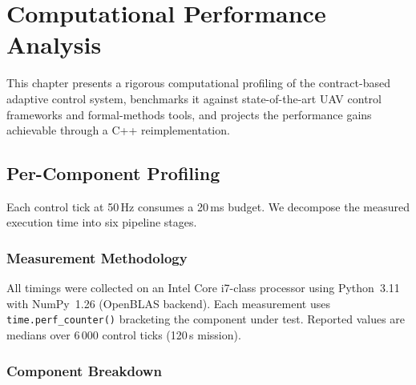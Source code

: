 
\chapter{Computational Performance Analysis}
\label{ch:performance}

This chapter presents a rigorous computational profiling of the contract-based adaptive control system, benchmarks it against state-of-the-art UAV control frameworks and formal-methods tools, and projects the performance gains achievable through a C++ reimplementation.

\section{Per-Component Profiling}
\label{sec:profiling}

Each control tick at 50\,Hz consumes a 20\,ms budget. We decompose the measured execution time into six pipeline stages.

\subsection{Measurement Methodology}

All timings were collected on an Intel Core i7-class processor using Python~3.11 with NumPy~1.26 (OpenBLAS backend). Each measurement uses \texttt{time.perf\_counter()} bracketing the component under test. Reported values are medians over 6\,000 control ticks (120\,s mission).

\subsection{Component Breakdown}

